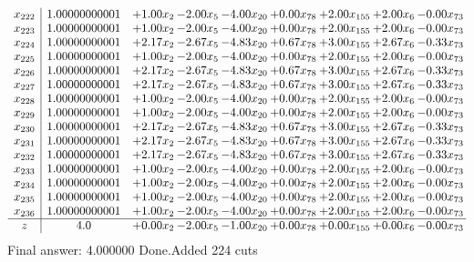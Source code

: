 \documentclass[8pt]{article}
\begin{document}
\[\begin{array}{c| c c@{\hskip 2pt} c@{\hskip 2pt} c@{\hskip 2pt} c@{\hskip 2pt} c@{\hskip 2pt} c@{\hskip 2pt} c@{\hskip 2pt} }
 x_{222}   &  1.00000000001 & +  1.00 x_{2} & -2.00 x_{5} & -4.00 x_{20} & +  0.00 x_{78} & +  2.00 x_{155} & +  2.00 x_{6} & -0.00 x_{73}\\
 x_{223}   &  1.00000000001 & +  1.00 x_{2} & -2.00 x_{5} & -4.00 x_{20} & +  0.00 x_{78} & +  2.00 x_{155} & +  2.00 x_{6} & -0.00 x_{73}\\
 x_{224}   &  1.00000000001 & +  2.17 x_{2} & -2.67 x_{5} & -4.83 x_{20} & +  0.67 x_{78} & +  3.00 x_{155} & +  2.67 x_{6} & -0.33 x_{73}\\
 x_{225}   &  1.00000000001 & +  1.00 x_{2} & -2.00 x_{5} & -4.00 x_{20} & +  0.00 x_{78} & +  2.00 x_{155} & +  2.00 x_{6} & -0.00 x_{73}\\
 x_{226}   &  1.00000000001 & +  2.17 x_{2} & -2.67 x_{5} & -4.83 x_{20} & +  0.67 x_{78} & +  3.00 x_{155} & +  2.67 x_{6} & -0.33 x_{73}\\
 x_{227}   &  1.00000000001 & +  2.17 x_{2} & -2.67 x_{5} & -4.83 x_{20} & +  0.67 x_{78} & +  3.00 x_{155} & +  2.67 x_{6} & -0.33 x_{73}\\
 x_{228}   &  1.00000000001 & +  1.00 x_{2} & -2.00 x_{5} & -4.00 x_{20} & +  0.00 x_{78} & +  2.00 x_{155} & +  2.00 x_{6} & -0.00 x_{73}\\
 x_{229}   &  1.00000000001 & +  1.00 x_{2} & -2.00 x_{5} & -4.00 x_{20} & +  0.00 x_{78} & +  2.00 x_{155} & +  2.00 x_{6} & -0.00 x_{73}\\
 x_{230}   &  1.00000000001 & +  2.17 x_{2} & -2.67 x_{5} & -4.83 x_{20} & +  0.67 x_{78} & +  3.00 x_{155} & +  2.67 x_{6} & -0.33 x_{73}\\
 x_{231}   &  1.00000000001 & +  2.17 x_{2} & -2.67 x_{5} & -4.83 x_{20} & +  0.67 x_{78} & +  3.00 x_{155} & +  2.67 x_{6} & -0.33 x_{73}\\
 x_{232}   &  1.00000000001 & +  2.17 x_{2} & -2.67 x_{5} & -4.83 x_{20} & +  0.67 x_{78} & +  3.00 x_{155} & +  2.67 x_{6} & -0.33 x_{73}\\
 x_{233}   &  1.00000000001 & +  1.00 x_{2} & -2.00 x_{5} & -4.00 x_{20} & +  0.00 x_{78} & +  2.00 x_{155} & +  2.00 x_{6} & -0.00 x_{73}\\
 x_{234}   &  1.00000000001 & +  1.00 x_{2} & -2.00 x_{5} & -4.00 x_{20} & +  0.00 x_{78} & +  2.00 x_{155} & +  2.00 x_{6} & -0.00 x_{73}\\
 x_{235}   &  1.00000000001 & +  1.00 x_{2} & -2.00 x_{5} & -4.00 x_{20} & +  0.00 x_{78} & +  2.00 x_{155} & +  2.00 x_{6} & -0.00 x_{73}\\
 x_{236}   &  1.00000000001 & +  1.00 x_{2} & -2.00 x_{5} & -4.00 x_{20} & +  0.00 x_{78} & +  2.00 x_{155} & +  2.00 x_{6} & -0.00 x_{73}\\
\hline
z    &  4.0 & +  0.00 x_{2} & -2.00 x_{5} & -1.00 x_{20} & +  0.00 x_{78} & +  0.00 x_{155} & +  0.00 x_{6} & -0.00 x_{73}\\
\end{array}\]
 Final answer: 4.000000 
Done.Added 224 cuts 
\end{document}
